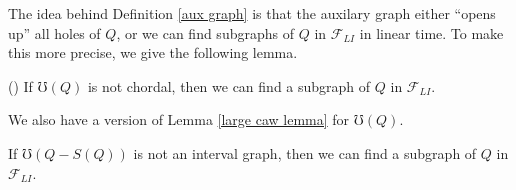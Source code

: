 \documentclass{article}
\begin{document}
    The idea behind Definition \ref{aux graph}
    is that the auxilary graph either
    ``opens up'' all holes of $Q$,
    or we can find subgraphs of $Q$ in
    $\mathcal{F}_{LI}$ in linear time. 
    To make this more precise, we 
    give the following lemma.

    \begin{lemma} (\cite{main}) 
        If $\mho\left(Q\right)$ is not chordal,
        then we can find a subgraph of
        $Q$ in $\mathcal{F}_{LI}$.
    \end{lemma}
   
    We also have a version of
    Lemma \ref{large caw lemma}
    for $\mho\left(Q\right)$.

    \begin{lemma}
        If $\mho\left(Q - S\left(Q\right)\right)$
        is not an interval graph,
        then we can
        find a subgraph of 
        $Q$ in $\mathcal{F}_{LI}$.
    \end{lemma}
\end{document}
